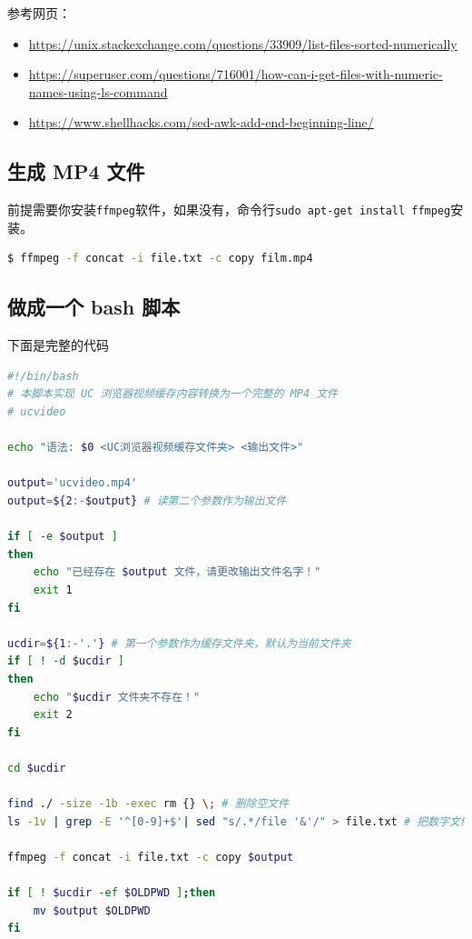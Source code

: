 \documentclass[doctor,openright,twoside]{sjtuthesis}
\providecommand{\tightlist}{%
    \setlength{\itemsep}{0pt}\setlength{\parskip}{0pt}}
\newcommand{\passthrough}[1]{#1}
\theoremstyle{plain}
\theoremstyle{definition}
\theoremstyle{remark}
\theoremstyle{ocrenumbox}
\theoremstyle{plain}
\begin{document}
参考网页：

\begin{itemize}
\tightlist
\item
  \url{https://unix.stackexchange.com/questions/33909/list-files-sorted-numerically}
\item
  \url{https://superuser.com/questions/716001/how-can-i-get-files-with-numeric-names-using-ls-command}
\item
  \url{https://www.shellhacks.com/sed-awk-add-end-beginning-line/}
\end{itemize}

\hypertarget{mp4-}{%
\subsection{生成 MP4 文件}\label{mp4-}}

前提需要你安装\passthrough{\lstinline!ffmpeg!}软件，如果没有，命令行\passthrough{\lstinline!sudo apt-get install ffmpeg!}安装。

\begin{lstlisting}[language=bash]
$ ffmpeg -f concat -i file.txt -c copy film.mp4
\end{lstlisting}

\hypertarget{bash-}{%
\subsection{做成一个 bash 脚本}\label{bash-}}

下面是完整的代码

\begin{lstlisting}[language=bash]
#!/bin/bash
# 本脚本实现 UC 浏览器视频缓存内容转换为一个完整的 MP4 文件
# ucvideo

echo "语法: $0 <UC浏览器视频缓存文件夹> <输出文件>"

output='ucvideo.mp4'
output=${2:-$output} # 读第二个参数作为输出文件

if [ -e $output ]
then
    echo "已经存在 $output 文件，请更改输出文件名字！"
    exit 1
fi

ucdir=${1:-'.'} # 第一个参数作为缓存文件夹，默认为当前文件夹
if [ ! -d $ucdir ]
then
    echo "$ucdir 文件夹不存在！"
    exit 2
fi

cd $ucdir

find ./ -size -1b -exec rm {} \; # 删除空文件
ls -1v | grep -E '^[0-9]+$'| sed "s/.*/file '&'/" > file.txt # 把数字文件按序，并加上行首行尾，写入file.txt

ffmpeg -f concat -i file.txt -c copy $output

if [ ! $ucdir -ef $OLDPWD ];then
    mv $output $OLDPWD
fi
\end{lstlisting}
\end{document}
